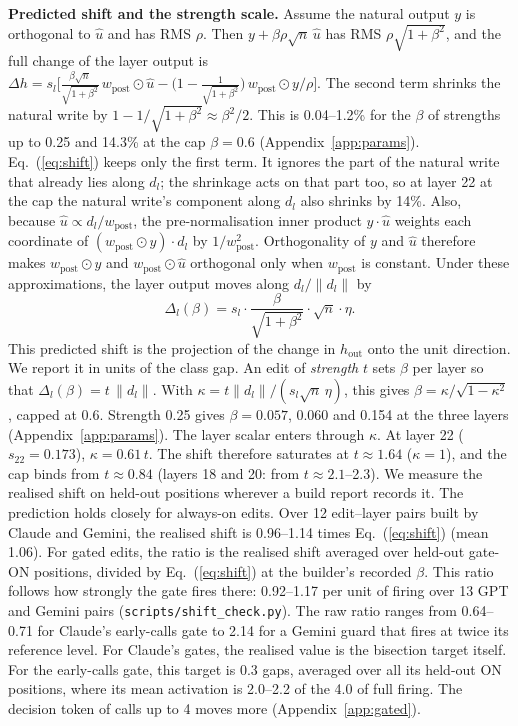 \textbf{Predicted shift and the strength scale.} Assume the natural output $y$ is orthogonal to $\hat{u}$ and has RMS $\rho$. Then $y + \beta \rho \sqrt{n}\, \hat{u}$ has RMS $\rho \sqrt{1+\beta^2}$, and the full change of the layer output is
$\Delta h = s_l \big[ \tfrac{\beta \sqrt{n}}{\sqrt{1+\beta^2}}\, w_{\mathrm{post}} \odot \hat{u} - \big(1 - \tfrac{1}{\sqrt{1+\beta^2}}\big)\, w_{\mathrm{post}} \odot y / \rho \big]$.
The second term shrinks the natural write by $1 - 1/\sqrt{1+\beta^2} \approx \beta^2/2$. This is 0.04--1.2\% for the $\beta$ of strengths up to 0.25 and 14.3\% at the cap $\beta = 0.6$ (Appendix~\ref{app:params}). Eq.~(\ref{eq:shift}) keeps only the first term. It ignores the part of the natural write that already lies along $d_l$; the shrinkage acts on that part too, so at layer 22 at the cap the natural write's component along $d_l$ also shrinks by 14\%. Also, because $\hat{u} \propto d_l / w_{\mathrm{post}}$, the pre-normalisation inner product $y \cdot \hat{u}$ weights each coordinate of $(w_{\mathrm{post}} \odot y) \cdot d_l$ by $1/w_{\mathrm{post}}^2$. Orthogonality of $y$ and $\hat{u}$ therefore makes $w_{\mathrm{post}} \odot y$ and $w_{\mathrm{post}} \odot \hat{u}$ orthogonal only when $w_{\mathrm{post}}$ is constant. Under these approximations, the layer output moves along $d_l / \lVert d_l \rVert$ by
\begin{equation}
\label{eq:shift}
    \Delta_l(\beta) = s_l \cdot \frac{\beta}{\sqrt{1+\beta^2}} \cdot \sqrt{n} \cdot \eta .
\end{equation}
This predicted shift is the projection of the change in $h_{\mathrm{out}}$ onto the unit direction. We report it in units of the class gap. An edit of \emph{strength} $t$ sets $\beta$ per layer so that $\Delta_l(\beta) = t\, \lVert d_l \rVert$. With $\kappa = t \lVert d_l \rVert / (s_l \sqrt{n}\, \eta)$, this gives $\beta = \kappa / \sqrt{1 - \kappa^2}$, capped at 0.6. Strength 0.25 gives $\beta = 0.057$, 0.060 and 0.154 at the three layers (Appendix~\ref{app:params}). The layer scalar enters through $\kappa$. At layer 22 ($s_{22} = 0.173$), $\kappa = 0.61\,t$. The shift therefore saturates at $t \approx 1.64$ ($\kappa = 1$), and the cap binds from $t \approx 0.84$ (layers 18 and 20: from $t \approx 2.1$--2.3). We measure the realised shift on held-out positions wherever a build report records it. The prediction holds closely for always-on edits. Over 12 edit--layer pairs built by Claude and Gemini, the realised shift is 0.96--1.14 times Eq.~(\ref{eq:shift}) (mean 1.06). For gated edits, the ratio is the realised shift averaged over held-out gate-ON positions, divided by Eq.~(\ref{eq:shift}) at the builder's recorded $\beta$. This ratio follows how strongly the gate fires there: 0.92--1.17 per unit of firing over 13 GPT and Gemini pairs (\texttt{scripts/shift\_check.py}). The raw ratio ranges from 0.64--0.71 for Claude's early-calls gate to 2.14 for a Gemini guard that fires at twice its reference level. For Claude's gates, the realised value is the bisection target itself. For the early-calls gate, this target is 0.3 gaps, averaged over all its held-out ON positions, where its mean activation is 2.0--2.2 of the 4.0 of full firing. The decision token of calls up to 4 moves more (Appendix~\ref{app:gated}).

